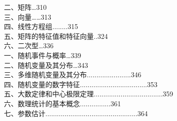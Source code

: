 \documentclass[a4paper,fleqn]{article}
\begin{document}
	二、矩阵…310\\
	三、向量……313\\
	四、线性方程组........315\\
	五、矩阵的特征值和特征向量..324\\
	六、二次型…336\\
	一、随机事件与概率…339\\
	二、随机变量及其分布…343\\
	三、多维随机变量及其分布.......................346\\
	四、随机变量的数字特征...................................353\\
	五、大数定律和中心极限定理....................................359\\
	六、数理统计的基本概念................361\\
	七、参数估计................................................364\\
\end{document}
